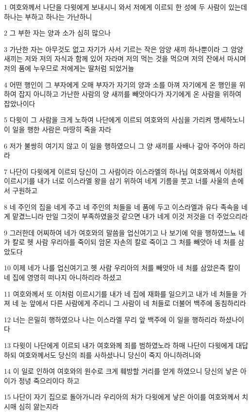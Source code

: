 \par 1 여호와께서 나단을 다윗에게 보내시니 와서 저에게 이르되 한 성에 두 사람이 있는데 하나는 부하고 하나는 가난하니
\par 2 그 부한 자는 양과 소가 심히 많으나
\par 3 가난한 자는 아무것도 없고 자기가 사서 기르는 작은 암양 새끼 하나뿐이라 그 암양 새끼는 저와 저의 자식과 함께 있어 자라며 저의 먹는 것을 먹으며 저의 잔에서 마시며 저의 품에 누우므로 저에게는 딸처럼 되었거늘
\par 4 어떤 행인이 그 부자에게 오매 부자가 자기의 양과 소를 아껴 자기에게 온 행인을 위하여 잡지 아니하고 가난한 사람의 양 새끼를 빼앗아다가 자기에게 온 사람을 위하여 잡았나이다
\par 5 다윗이 그 사람을 크게 노하여 나단에게 이르되 여호와의 사심을 가리켜 맹세하노니 이 일을 행한 사람은 마땅히 죽을 자라
\par 6 저가 불쌍히 여기지 않고 이 일을 행하였으니 그 양 새끼를 사배나 갚아 주어야 하리라
\par 7 나단이 다윗에게 이르되 당신이 그 사람이라 이스라엘의 하나님 여호와께서 이처럼 이르시기를 내가 너로 이스라엘 왕을 삼기 위하여 네게 기름을 붓고 너를 사울의 손에서 구원하고
\par 8 네 주인의 집을 네게 주고 네 주인의 처들을 네 품에 두고 이스라엘과 유다 족속을 네게 맡겼느니라 만일 그것이 부족하였을것 같으면 내가 네게 이것 저것을 더 주었으리라
\par 9 그러한데 어찌하여 네가 여호와의 말씀을 업신여기고 나 보기에 악을 행하였느뇨 네가 칼로 헷 사람 우리아를 죽이되 암몬 자손의 칼로 죽이고 그 처를 빼앗아 네 처를 삼았도다
\par 10 이제 네가 나를 업신여기고 헷 사람 우리아의 처를 빼앗아 네 처를 삼았은즉 칼이 네 집에 영영히 떠나지 아니하리라 하셨고
\par 11 여호와께서 또 이처럼 이르시기를 내가 네 집에 재화를 일으키고 내가 네 처들을 가져 네 눈 앞에서 다른 사람에게 주리니 그 사람이 네 처들로 더불어 백주에 동침하리라
\par 12 너는 은밀히 행하였으나 나는 이스라엘 무리 앞 백주에 이 일을 행하리라 하셨나이다
\par 13 다윗이 나단에게 이르되 내가 여호와께 죄를 범하였노라 하매 나단이 다윗에게 대답하되 여호와께서도 당신의 죄를 사하셨나니 당신이 죽지 아니하려니와
\par 14 이 일로 인하여 여호와의 원수로 크게 훼방할 거리를 얻게 하였으니 당신의 낳은 아이가 정녕 죽으리이다 하고
\par 15 나단이 자기 집으로 돌아가니라 우리아의 처가 다윗에게 낳은 아이를 여호와께서 치시매 심히 앓는지라
